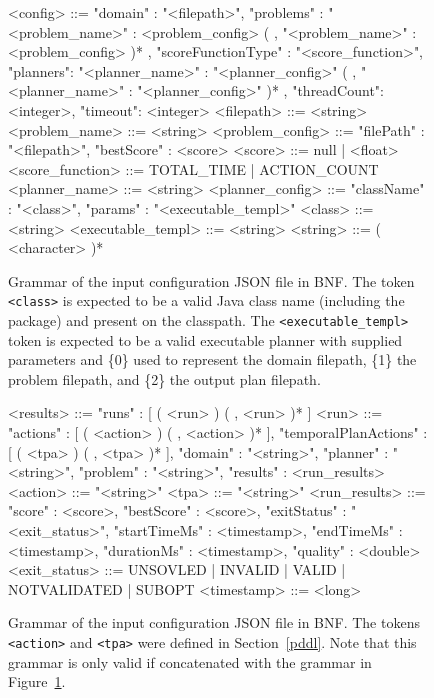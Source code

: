 \begin{figure}[tbp]
\centering
\begin{code}
<config> ::= { "domain" : "<filepath>",
               "problems" : { "<problem_name>" : <problem_config>
                          ( , "<problem_name>" : <problem_config> )* },
               "scoreFunctionType"  : "<score_function>",
               "planners": { "<planner_name>" : "<planner_config>"
                        ( , "<planner_name>" : "<planner_config>" )* },
               "threadCount": <integer>,
               "timeout": <integer> }
<filepath> ::= <string>
<problem_name> ::= <string>
<problem_config> ::= { "filePath" : "<filepath>",
                       "bestScore" : <score> }
<score> ::= null | <float>
<score_function> ::= TOTAL_TIME | ACTION_COUNT
<planner_name> ::= <string>
<planner_config> ::= { "className" : "<class>",
                       "params" : "<executable_templ>" }
<class> ::= <string>
<executable_templ> ::= <string>
<string> ::= ( <character> )*
\end{code}
\caption[Grammar of the input configuration JSON file in BNF.]{Grammar of the input configuration JSON file in BNF. The token \texttt{<class>}
is expected to be a valid Java class name (including the package) and present on the classpath.
The \texttt{<executable\_templ>} token is expected to be a valid executable planner with supplied parameters
and \{0\} used to represent the domain filepath, \{1\} the problem filepath, and \{2\} the output plan filepath.}
\label{code:benchmark-config-bnf}
\end{figure}

\begin{figure}[tbp]
\centering
\begin{code}
<results> ::= { "runs" : [ ( <run> ) ( , <run> )* ] }
<run> ::= { "actions" : [ ( <action> ) ( , <action> )* ],
            "temporalPlanActions" : [ ( <tpa> ) ( , <tpa> )* ],
            "domain" : "<string>",
            "planner" : "<string>",
            "problem" : "<string>",
            "results" : <run_results> }
<action> ::= "<string>"
<tpa> ::= "<string>"
<run_results> ::= { "score" : <score>,
                    "bestScore" : <score>,
                    "exitStatus" : "<exit_status>",
                    "startTimeMs" : <timestamp>,
                    "endTimeMs" : <timestamp>,
                    "durationMs" : <timestamp>,
                    "quality" : <double> }
<exit_status> ::= UNSOVLED | INVALID | VALID | NOTVALIDATED | SUBOPT
<timestamp> ::= <long>
\end{code}
\caption[Grammar of the input configuration JSON file in BNF.]{Grammar of the input configuration JSON file in BNF.
The tokens \texttt{<action>} and \texttt{<tpa>} were defined in Section~\ref{pddl}. Note
that this grammar is only valid if concatenated with the grammar in Figure~\ref{code:benchmark-config-bnf}.}
\label{code:benchmark-results-bnf}
\end{figure}





